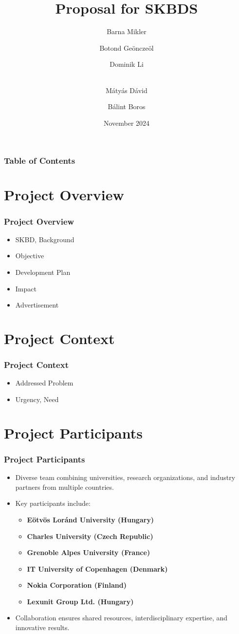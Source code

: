 \documentclass{beamer}
\title[SKBD] {Proposal for SKBDS}
\author[Pictures]
{Barna Mikler \and Botond Geönczeöl \and Dominik Li \and \\ Mátyás Dávid \and Bálint Boros}
\institute[ELTE]{Eötvös Loránd University \\ Faculty of Informatics}
\date[2024] {November 2024}
\begin{document}
\frame{\titlepage}

\begin{frame}
\frametitle{Table of Contents}
\tableofcontents
\end{frame}  

\section{Project Overview}
\begin{frame}
\frametitle{Project Overview}
\begin{itemize}
    \item SKBD, Background
    \item Objective
    \item Development Plan
    \item Impact
    \item Advertisement
\end{itemize}
\end{frame}

\section{Project Context}
\begin{frame}
\frametitle{Project Context}
\begin{itemize}
    \item Addressed Problem
    \item Urgency, Need
\end{itemize}
\end{frame}

\section{Project Participants}
\begin{frame}
\frametitle{Project Participants}
\begin{itemize}
    \item Diverse team combining universities, research organizations, and industry partners from multiple countries.
    \item Key participants include:
    \begin{itemize}
        \item \textbf{Eötvös Loránd University (Hungary)}
        \item \textbf{Charles University (Czech Republic)}
        \item \textbf{Grenoble Alpes University (France)}
        \item \textbf{IT University of Copenhagen (Denmark)}
        \item \textbf{Nokia Corporation (Finland)}
        \item \textbf{Lexunit Group Ltd. (Hungary)}
    \end{itemize}
    \item Collaboration ensures shared resources, interdisciplinary expertise, and innovative results.
\end{itemize}
\end{frame}
\end{document}
